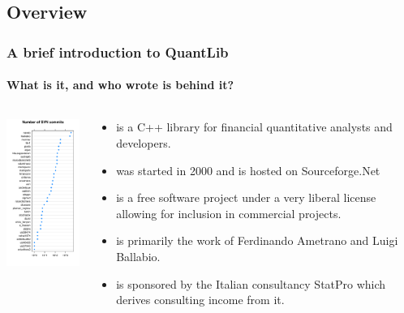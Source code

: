 \documentclass[compress]{beamer}
\begin{document}
\subsection{Overview}
\begin{frame}
  \frametitle{A brief introduction to QuantLib}
  \framesubtitle{What is it, and who wrote is behind it?}
  \begin{columns}
    \begin{column}{1.5in}
      \includegraphics[width=1.5in]{figures/ql-svn.pdf}
    \end{column}
    
    \begin{column}{3.1in}
      \begin{itemize}
      \item \QL is a C++ library for financial quantitative analysts and developers.
      \item \QL was started in 2000 and is hosted on Sourceforge.Net
      \item \QL is a free software project under a very liberal license allowing
        for inclusion in commercial projects.
      \item \QL is primarily the work of Ferdinando Ametrano and Luigi Ballabio.
      \item \QL is sponsored by the Italian consultancy StatPro which derives
        consulting income from it. 
      \end{itemize}
    \end{column}
  \end{columns}
\end{frame}
\end{document}
